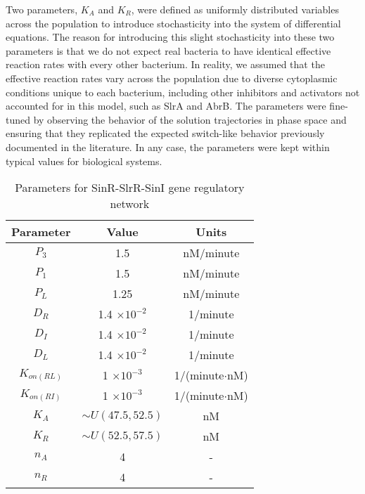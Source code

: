 Two parameters, \(K_A\) and \(K_R\), were defined as uniformly distributed variables across the population to introduce stochasticity into the system of differential equations. The reason for introducing this slight stochasticity into these two parameters is that we do not expect real bacteria to have identical effective reaction rates with every other bacterium. In reality, we assumed that the effective reaction rates vary across the population due to diverse cytoplasmic conditions unique to each bacterium, including other inhibitors and activators not accounted for in this model, such as SlrA and AbrB. The parameters were fine-tuned by observing the behavior of the solution trajectories in phase space and ensuring that they replicated the expected switch-like behavior previously documented in the literature. In any case, the parameters were kept within typical values for biological systems.

  \begin{table}
    \centering
    \caption{\footnotesize Parameters for SinR-SlrR-SinI gene regulatory network}
    \label{table:parameters}
    \begin{tabular}{|c|c|c|}
      \hline
      Parameter & Value & Units  \\
      \hline
      \(P_3\) & 1.5 & nM/minute \\
      \(P_1\) & 1.5 & nM/minute \\
      \(P_L\) & 1.25 & nM/minute \\
      
      \(D_R\) & 1.4 \(\times 10^{-2}\) & 1/minute  \\   
      \(D_I\) & 1.4 \(\times 10^{-2}\) & 1/minute  \\
      \(D_L\) & 1.4 \(\times 10^{-2}\) & 1/minute  \\ 
      \(K_{on(RL)}\) & 1 \(\times 10^{-3}\) & 1/(minute\(\cdot\)nM)  \\
      \(K_{on(RI)}\) & 1 \(\times 10^{-3}\) & 1/(minute\(\cdot\)nM)  \\ 

      
      \(K_A\) & \( \sim U(47.5, 52.5)\) & nM  \\
      \(K_R\) & \( \sim U(52.5, 57.5)\) & nM \\

      

      \(n_A\) & 4 & -  \\
      
      \(n_R\) & 4 & -  \\
    
      \hline
    \end{tabular}
  \end{table}

